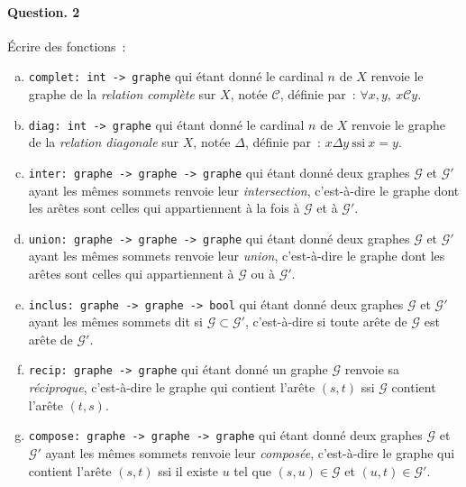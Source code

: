 \documentclass[10pt,a4paper]{article}
\begin{document}
\paragraph{Question. 2\\}
Écrire des fonctions~:
\begin{enumerate}[a)]
\item \texttt{complet: int -> graphe} qui étant donné le cardinal $n$ de $X$
renvoie le graphe de la \textit{relation complète} sur $X$, notée $\mathcal{C}$,
définie par~: $\forall x, y, \ x \mathcal{C} y$.
\item \texttt{diag: int -> graphe} qui étant donné le cardinal $n$ de $X$
renvoie le graphe de la \textit{relation diagonale} sur $X$, notée $\Delta$, 
définie par~: $x \Delta y \ \mathrm{ssi} \ x=y$.
\item \texttt{inter: graphe -> graphe -> graphe} qui étant donné
deux graphes $\mathcal{G}$ et $\mathcal{G'}$ ayant les mêmes sommets renvoie leur 
\textit{intersection}, c'est-à-dire le graphe dont les arêtes sont celles qui appartiennent
à la fois à $\mathcal{G}$ et à $\mathcal{G'}$.
\item \texttt{union: graphe -> graphe -> graphe} qui étant donné
deux graphes $\mathcal{G}$ et $\mathcal{G'}$ ayant les mêmes sommets renvoie leur 
\textit{union}, c'est-à-dire le graphe dont les arêtes sont celles qui appartiennent à
$\mathcal{G}$ ou à $\mathcal{G'}$.
\item \texttt{inclus: graphe -> graphe -> bool} qui étant donné
deux graphes $\mathcal{G}$ et $\mathcal{G'}$ ayant les mêmes sommets dit si 
$\mathcal{G} \subset \mathcal{G'}$, c'est-à-dire si toute arête de $\mathcal{G}$
est arête de $\mathcal{G'}$.
\item \texttt{recip: graphe -> graphe} qui étant donné un graphe 
$\mathcal{G}$ renvoie sa \textit{réciproque}, c'est-à-dire le graphe qui contient l'arête 
$(s,t)$ ssi $\mathcal{G}$ contient l'arête $(t,s)$.
\item \texttt{compose: graphe -> graphe -> graphe} qui étant donné 
deux graphes $\mathcal{G}$ et $\mathcal{G'}$ ayant les mêmes sommets renvoie leur 
\textit{composée}, c'est-à-dire le graphe qui contient l'arête $(s,t)$ ssi il existe 
$u$ tel que $(s,u)\in \mathcal{G}$ et $(u,t) \in \mathcal{G'}$.
\end{enumerate}
\end{document}

